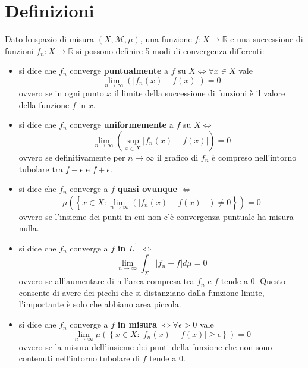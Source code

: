 \documentclass[12pt,a4paper]{report}
\begin{document}
\section*{Definizioni}
Dato lo spazio di misura \(\left(X, \mathcal{M}, \mu \right) \), una funzione \(f : X \rightarrow \mathbb{R}\) e una successione di funzioni \(f_{n} : X \rightarrow \mathbb{R} \) si possono definire 5 modi di convergenza differenti:

\begin{itemize}
 \item si dice che \(f_{n}\) converge \textbf{puntualmente} a \(f\) su \(X \iff \forall x \in X\) vale
\[\lim_{n \to \infty } \left( {|f_{n}\left(x \right) - f\left(x\right) | } \right) =0 \]
ovvero se in ogni punto \(x\) il limite della successione di funzioni è il valore della funzione \(f\) in \(x\).

 \item si dice che \(f_{n}\) converge \textbf{uniformemente} a \(f\) su \(X \iff \)
\[ \lim_{n \rightarrow \infty } \left( \sup_{x \in X}{|f_{n}\left(x \right) - f\left(x\right) | } \right) =0 \]
ovvero se definitivamente per \(n\to\infty \) il grafico di \(f_{n}\) è compreso nell'intorno tubolare tra \(f - \epsilon\) \quad e \quad \(f+\epsilon\).

 \item si dice che \(f_{n}\) converge a \(f\) \textbf{quasi ovunque} \(\iff \)
\[\mu \left( \left\lbrace x \in X : \lim_{n \to \infty } \left( {\mid f_{n}\left(x \right) - f\left(x\right)\mid } \right) \neq 0 \right\rbrace \right) = 0 \]
ovvero se l'insieme dei punti in cui non c'è convergenza puntuale ha misura nulla.

 \item si dice che \(f_{n}\) converge a \(f\) \textbf{in \(L^{1}\)} \(\iff\)
\[ \lim_{n \rightarrow \infty} \int_{X}{ |f_{n} - f | d\mu = 0} \]
ovvero se all'aumentare di n l'area compresa tra \(f_{n}\) e \(f\) tende a 0. Questo consente di avere dei picchi che si distanziano dalla funzione limite, l'importante è solo che abbiano area piccola.

 \item si dice che \(f_{n}\) converge a \(f\) \textbf{in misura} \(\iff \forall \epsilon > 0 \) vale
\[ \lim_{n \rightarrow \infty}{ \mu \left( \left\lbrace x \in X : | f_{n} \left( x \right) - f \left( x \right) | \geq \epsilon \right\rbrace \right)} = 0 \]
ovvero se la misura dell'insieme dei punti della funzione che non sono contenuti nell'intorno tubolare di \(f\) tende a 0.
\end{itemize}
\end{document}
